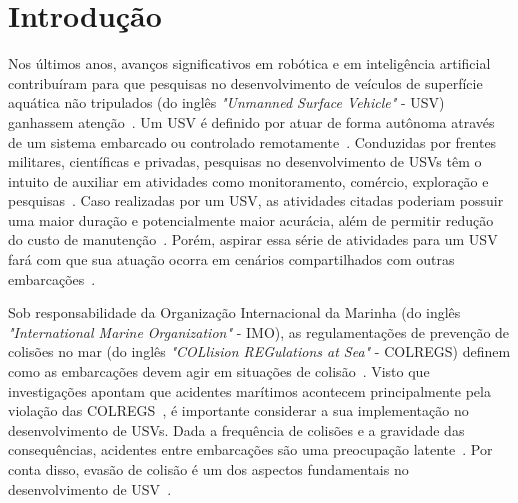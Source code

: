 


\chapter{Introdução}\label{chap1:intro}
	Nos últimos anos, avanços significativos em robótica e em inteligência artificial contribuíram para que pesquisas no desenvolvimento de veículos de superfície aquática não tripulados (do inglês \textit{"Unmanned Surface Vehicle"} - USV) ganhassem atenção~\cite{Huang2020Ship}. Um USV é definido por atuar de forma autônoma através de um sistema embarcado ou controlado remotamente~\cite{Song2018Two-level}. Conduzidas por frentes militares, científicas e privadas, pesquisas no desenvolvimento de USVs têm o intuito de auxiliar em atividades como monitoramento, comércio, exploração e pesquisas~\cite{Jurak2020COLREGS}. Caso realizadas por um USV, as atividades citadas poderiam possuir uma maior duração e potencialmente maior acurácia, além de permitir redução do custo de manutenção~\cite{Liu2016Unmanned}. Porém, aspirar essa série de atividades para um USV fará com que sua atuação ocorra em cenários compartilhados com outras embarcações~\cite{Kuwata2014Safe}.

    Sob responsabilidade da Organização Internacional da Marinha (do inglês \textit{"International Marine Organization"} - IMO), as regulamentações de prevenção de colisões no mar (do inglês \textit{"COLlision REGulations at Sea"} - COLREGS) definem como as embarcações devem agir em situações de colisão~\cite{Jurak2020COLREGS}. Visto que investigações apontam que acidentes marítimos acontecem principalmente pela violação das COLREGS~\cite{Song2018Two-level}, é importante considerar a sua implementação no desenvolvimento de USVs. Dada a frequência de colisões e a gravidade das consequências, acidentes entre embarcações são uma preocupação latente~\cite{Huang2019Generalized}. Por conta disso, evasão de colisão é um dos aspectos fundamentais no desenvolvimento de USV~\cite{Jurak2020COLREGS}. 

